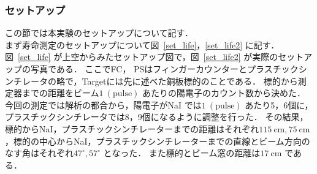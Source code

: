 \subsubsection{セットアップ}
この節では本実験のセットアップについて記す．\\
まず寿命測定のセットアップについて図~\ref{set_life}，\ref{set_life2} に記す．
図~\ref{set_life} が上空からみたセットアップ図で，図~\ref{set_life2} が実際のセットアップの写真である．
ここでFC， PSはフィンガーカウンターとプラスチックシンチレータの略で，Targetには先に述べた銅板標的のことである．
標的から測定器までの距離をビーム$1~(\mathrm{pulse})$ あたりの陽電子のカウント数から決めた．
今回の測定では解析の都合から，陽電子がNaI では$1~(\mathrm{pulse})$ あたり5，6個に，プラスチックシンチレータでは8，9個になるように調整を行った．
その結果，標的からNaI，プラスチックシンチレーターまでの距離はそれぞれ$115~\mathrm{cm},75~\mathrm{cm}$，標的の中心からNaI，プラスチックシンチレーターまでの直線とビーム方向のなす角はそれぞれ$47^\circ, 57^\circ$ となった．
また標的とビーム窓の距離は$17~\mathrm{cm}$ である．

